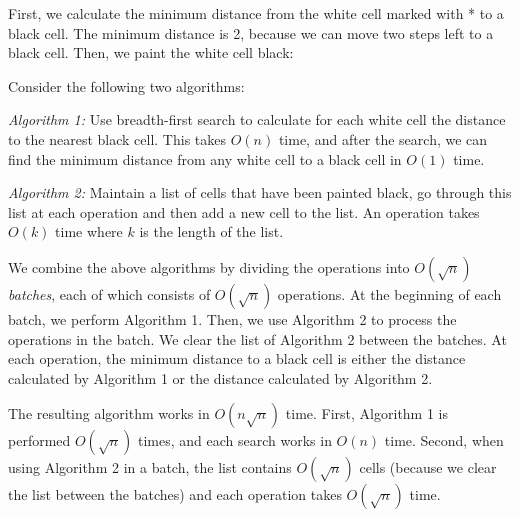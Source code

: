 \begin{center}
\end{center}

First, we calculate the minimum distance
from the white cell marked with * to a black cell.
The minimum distance is 2, because we can move
two steps left to a black cell.
Then, we paint the white cell black:

\begin{center}
\end{center}

Consider the following two algorithms:

\emph{Algorithm 1:} Use breadth-first search
to calculate
for each white cell the distance to the nearest black cell.
This takes $O(n)$ time, and after the search,
we can find the minimum distance from any white cell
to a black cell in $O(1)$ time.

\emph{Algorithm 2:} Maintain a list of cells that have been
painted black, go through this list at each operation
and then add a new cell to the list.
An operation takes $O(k)$ time where $k$ is the length of the list.

We combine the above algorithms by
dividing the operations into
$O(\sqrt n)$ \emph{batches}, each of which consists
of $O(\sqrt n)$ operations.
At the beginning of each batch,
we perform Algorithm 1.
Then, we use Algorithm 2 to process the operations
in the batch.
We clear the list of Algorithm 2 between
the batches.
At each operation,
the minimum distance to a black cell
is either the distance calculated by Algorithm 1
or the distance calculated by Algorithm 2.

The resulting algorithm works in
$O(n \sqrt n)$ time.
First, Algorithm 1 is performed $O(\sqrt n)$ times,
and each search works in $O(n)$ time.
Second, when using Algorithm 2 in a batch,
the list contains $O(\sqrt n)$ cells
(because we clear the list between the batches)
and each operation takes $O(\sqrt n)$ time.


